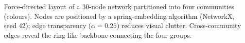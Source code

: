\caption{Force-directed layout of a 30-node network partitioned into four communities (colours). Nodes are positioned by a spring-embedding algorithm (NetworkX, seed 42); edge transparency ($\alpha=0.25$) reduces visual clutter. Cross-community edges reveal the ring-like backbone connecting the four groups.}
